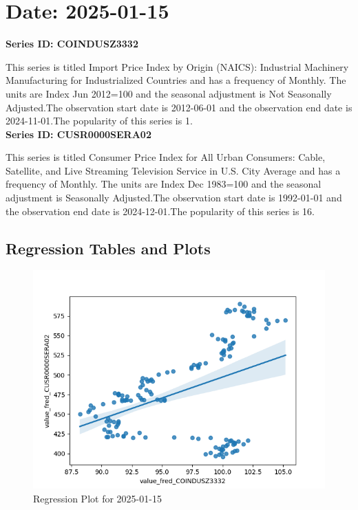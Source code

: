 \section{Date: 2025-01-15}
\noindent \textbf{Series ID: COINDUSZ3332} 

\noindent This series is titled Import Price Index by Origin (NAICS): Industrial Machinery Manufacturing for Industrialized Countries and has a frequency of Monthly. The units are Index Jun 2012=100 and the seasonal adjustment is Not Seasonally Adjusted.The observation start date is 2012-06-01 and the observation end date is 2024-11-01.The popularity of this series is 1. \\ 

\noindent \textbf{Series ID: CUSR0000SERA02} 

\noindent This series is titled Consumer Price Index for All Urban Consumers: Cable, Satellite, and Live Streaming Television Service in U.S. City Average and has a frequency of Monthly. The units are Index Dec 1983=100 and the seasonal adjustment is Seasonally Adjusted.The observation start date is 1992-01-01 and the observation end date is 2024-12-01.The popularity of this series is 16. \\ 

\subsection{Regression Tables and Plots}


\begin{figure}
\centering
\includegraphics[scale = 0.9]{plots/plot_2025-01-15.png}
\caption{Regression Plot for 2025-01-15}
\end{figure}
\newpage
